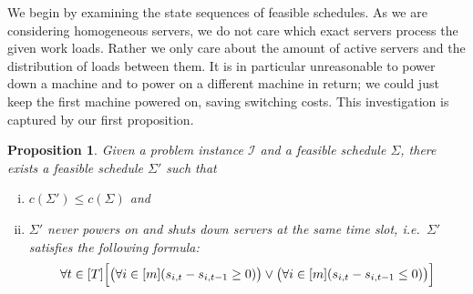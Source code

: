 \documentclass[hidelinks]{article}
\theoremstyle{plain}
\newtheorem{prop}[thm]{Proposition}
\theoremstyle{definition}
\theoremstyle{rem}
\newcommand{\inp}{\mathcal{I}}
\newcommand{\costs}{c}
\begin{document}
We begin by examining the state sequences of feasible schedules. As we are considering homogeneous servers, we do not care which exact servers process the given work loads. Rather we only care about the amount of active servers and the distribution of loads between them. It is in particular unreasonable to power down a machine and to power on a different machine in return; we could just keep the first machine powered on, saving switching costs.
This investigation is captured by our first proposition.
\begin{prop}\label{prop_strict_switching}
Given a problem instance $\inp$ and a feasible schedule $\Sigma$, there exists a feasible schedule $\Sigma'$ such that 
\begin{enumerate}[(i)]
		\item $\costs(\Sigma')\le \costs(\Sigma)$ and 
		\item $\Sigma'$ never powers on and shuts down servers at the same time slot, i.e.\ $\Sigma'$ satisfies the following formula:
\begin{equation}
	\forall t\in[T]\Bigl[\bigl(\forall i\in[m](s_{i,t}-s_{i,t-1}\ge0)\bigr)\lor\bigl(\forall i\in[m](s_{i,t}-s_{i,t-1}\le 0)\bigr)\Bigr]\label{eq_strict_switching}
\end{equation}
\end{enumerate}
\end{prop}
\end{document}
